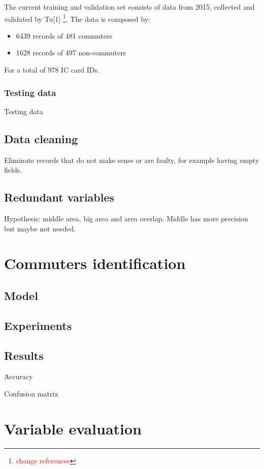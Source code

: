 \documentclass{article}
\newcommand{\selfnote}[1]{\footnote{\textcolor{red}{#1}}}
\begin{document}
The current training and validation set consists of data from 2015, collected and validated by Tu[1] \selfnote{change references}. The data is composed by:

\begin{itemize}
\item 6439 records of 481 commuters
\item 1628 records of 497 non-commuters
\end{itemize}

For a total of 978 IC card IDs.

\subsubsection{Testing data}
Testing data

\subsection{Data cleaning}
Eliminate records that do not make sense or are faulty, for example having empty fields. 

\subsection{Redundant variables}
Hypothesis: middle area, big area and area overlap. Middle has more precision but maybe not needed.

\section{Commuters identification}
\subsection{Model}

\subsection{Experiments}

\subsection{Results}

Accuracy

Confusion matrix

\section{Variable evaluation}
\end{document}
